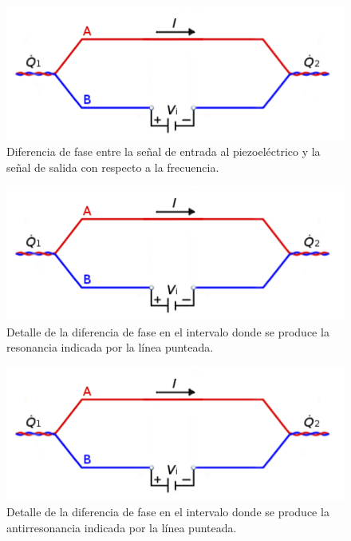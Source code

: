 \documentclass[twoside,twocolumn,a4paper]{article}
\begin{document}
\begin{figure}[H]
\includegraphics[width=\linewidth]{peltier.jpg}
\caption{Diferencia de fase entre la se\~nal de entrada al piezoel\'ectrico y la se\~nal de salida con respecto a la frecuencia.}
\label{fig:fase}
\end{figure}

\begin{figure}[H]
\includegraphics[width=\linewidth]{peltier.jpg}
\caption{Detalle de la diferencia de fase en el intervalo donde se produce la resonancia indicada por la l\'inea punteada.}
\label{fig:bajada}
\end{figure}

\begin{figure}[H]
\includegraphics[width=\linewidth]{peltier.jpg}
\caption{Detalle de la diferencia de fase en el intervalo donde se produce la antirresonancia indicada por la l\'inea punteada.}
\label{fig:subida}
\end{figure}
\end{document}
